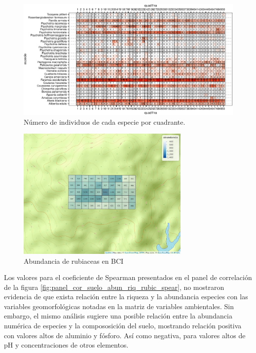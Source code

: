 \documentclass[11pt,]{article}
\begin{document}
\begin{figure}
\centering
\includegraphics{manuscrito_files/figure-latex/unnamed-chunk-2-1.pdf}
\caption{\label{fig:abun_sp_q}Número de individuos de cada especie por
cuadrante.}
\end{figure}

\begin{figure}
\centering
\includegraphics[width=0.75000\textwidth]{mapa_cuadros_abun_rubic.png}
\caption{Abundancia de rubiaceas en BCI
\label{fig:mapa_cuadros_abun_rubic}}
\end{figure}

Los valores para el coeficiente de Spearman presentados en el panel de
correlación de la figura \ref{fig:panel_cor_suelo_abun_riq_rubic_spear},
no mostraron evidencia de que exista relación entre la riqueza y la
abundancia especies con las variables geomorfológicas notadas en la
matriz de variables ambientales. Sin embargo, el mismo análisis sugiere
una posible relación entre la abundancia numérica de especies y la
compososición del suelo, mostrando relación positiva con valores altos
de aluminio y fósforo. Así como negativa, para valores altos de pH y
concentraciones de otros elementos.
\end{document}
